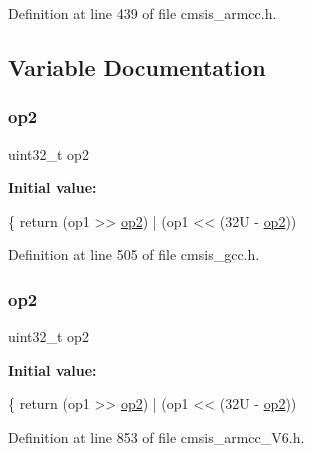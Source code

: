 Definition at line 439 of file cmsis\+\_\+armcc.\+h.



\subsection{Variable Documentation}
\mbox{\label{group___c_m_s_i_s___core___instruction_interface_gadb2bb33809b6f35ba4d176cbec7c7b75}} 
\subsubsection{\texorpdfstring{op2}{op2}\hspace{0.1cm}{\footnotesize\ttfamily [1/2]}}
{\footnotesize\ttfamily uint32\+\_\+t op2}

{\bfseries Initial value\+:}
\begin{DoxyCode}
\{
  \textcolor{keywordflow}{return} (op1 >> \hyperlink{group___c_m_s_i_s___core___instruction_interface_gadb2bb33809b6f35ba4d176cbec7c7b75}{op2}) | (op1 << (32U - \hyperlink{group___c_m_s_i_s___core___instruction_interface_gadb2bb33809b6f35ba4d176cbec7c7b75}{op2}))
\end{DoxyCode}


Definition at line 505 of file cmsis\+\_\+gcc.\+h.

\mbox{\label{group___c_m_s_i_s___core___instruction_interface_gadb2bb33809b6f35ba4d176cbec7c7b75}} 
\subsubsection{\texorpdfstring{op2}{op2}\hspace{0.1cm}{\footnotesize\ttfamily [2/2]}}
{\footnotesize\ttfamily uint32\+\_\+t op2}

{\bfseries Initial value\+:}
\begin{DoxyCode}
\{
  \textcolor{keywordflow}{return} (op1 >> \hyperlink{group___c_m_s_i_s___core___instruction_interface_gadb2bb33809b6f35ba4d176cbec7c7b75}{op2}) | (op1 << (32U - \hyperlink{group___c_m_s_i_s___core___instruction_interface_gadb2bb33809b6f35ba4d176cbec7c7b75}{op2}))
\end{DoxyCode}


Definition at line 853 of file cmsis\+\_\+armcc\+\_\+\+V6.\+h.


